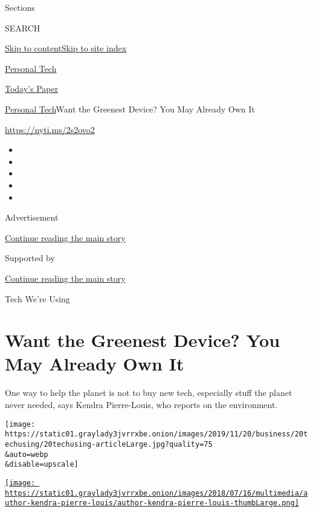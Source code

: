 Sections

SEARCH

\protect\hyperlink{site-content}{Skip to
content}\protect\hyperlink{site-index}{Skip to site index}

\href{https://www.nytimes3xbfgragh.onion/section/technology/personaltech}{Personal
Tech}

\href{https://myaccount.nytimes3xbfgragh.onion/auth/login?response_type=cookie\&client_id=vi}{}

\href{https://www.nytimes3xbfgragh.onion/section/todayspaper}{Today's
Paper}

\href{/section/technology/personaltech}{Personal Tech}\textbar{}Want the
Greenest Device? You May Already Own It

\url{https://nyti.ms/2s2ovo2}

\begin{itemize}
\item
\item
\item
\item
\item
\end{itemize}

Advertisement

\protect\hyperlink{after-top}{Continue reading the main story}

Supported by

\protect\hyperlink{after-sponsor}{Continue reading the main story}

Tech We're Using

\hypertarget{want-the-greenest-device-you-may-already-own-it}{%
\section{Want the Greenest Device? You May Already Own
It}\label{want-the-greenest-device-you-may-already-own-it}}

One way to help the planet is not to buy new tech, especially stuff the
planet never needed, says Kendra Pierre-Louis, who reports on the
environment.

\texttt{[image: https://static01.graylady3jvrrxbe.onion/images/2019/11/20/business/20techusing/20techusing-articleLarge.jpg?quality=75\\\&auto=webp\\\&disable=upscale]}

\href{https://www.nytimes3xbfgragh.onion/by/kendra-pierre-louis}{\texttt{[image: https://static01.graylady3jvrrxbe.onion/images/2018/07/16/multimedia/author-kendra-pierre-louis/author-kendra-pierre-louis-thumbLarge.png]}}

